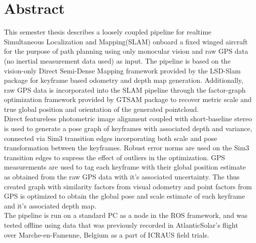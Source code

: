 \chapter*{Abstract}

This semester thesis describes a loosely coupled pipeline for realtime Simultaneous Localization and Mapping(SLAM) onboard a fixed winged aircraft for the purpose of path planning using only monocular vision and raw GPS data (no inertial measurement data used) as input. The pipeline is based on the vision-only Direct Semi-Dense Mapping framework provided by the LSD-Slam package for keyframe based odometry and depth map generation. Additionally, raw GPS data is incorporated into the SLAM pipeline through the factor-graph optimization framework provided by GTSAM package to recover metric scale and true global position and orientation of the generated pointcloud. \\
Direct featureless photometric image alignment coupled with short-baseline stereo is used to generate a pose graph of keyframes with associated depth and variance, connected via Sim3 transition edges incorporating both scale and pose transformation between the keyframes. Robust error norms are used on the Sim3 transition edges to supress the effect of outliers in the optimization. GPS measurements are used to tag each keyframe with their global position estimate as obtained from the raw GPS data with it's associated uncertainty. The thus created graph with similarity factors from visual odometry and point factors from GPS is optimized to obtain the global pose and scale estimate of each keyframe and it's associated depth map.\\
The pipeline is run on a standard PC as a node in the ROS framework, and was tested offline using data that was previously recorded in AtlanticSolar’s flight over Marche-en-Famenne, Belgium as a part of ICRAUS field trials.